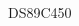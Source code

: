 \documentclass[10pt,a4paper,final]{article}
\begin{document}
\begin{spacing}{1.5}
\begin{multicols}{3}
\\
DS89C450\\

\end{multicols}
\end{spacing}
\end{document}
